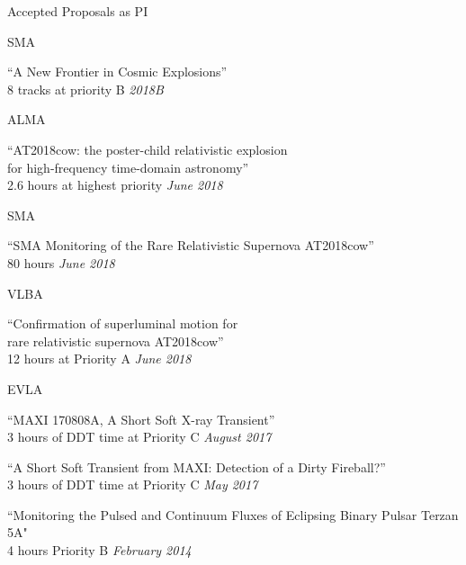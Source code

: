 \documentclass{resume} %
\begin{document}
\begin{rSection}{Accepted Proposals as PI}

\begin{rSubsection}{SMA}{}{}{}
\item ``A New Frontier in Cosmic Explosions''\\
  8 tracks at priority B \hfill {\em 2018B}
\end{rSubsection}

\begin{rSubsection}{ALMA}{}{}{}
\item ``AT2018cow: the poster-child relativistic explosion \\
  for high-frequency time-domain astronomy'' \\
  2.6 hours at highest priority \hfill {\em June 2018}
\end{rSubsection}

\begin{rSubsection}{SMA}{}{}{}
\item ``SMA Monitoring of the Rare Relativistic Supernova AT2018cow'' \\
  80 hours \hfill {\em June 2018}
\end{rSubsection}

\begin{rSubsection}{VLBA}{}{}{}
\item ``Confirmation of superluminal motion for \\
  rare relativistic supernova AT2018cow''\\
  12 hours at Priority A \hfill {\em June 2018}
\end{rSubsection}

\begin{rSubsection}{EVLA}{}{}{}
\item ``MAXI 170808A, A Short Soft X-ray Transient'' \\
  3 hours of DDT time at Priority C \hfill {\em August 2017}
\item ``A Short Soft Transient from MAXI: Detection of a Dirty Fireball?'' \\
  3 hours of DDT time at Priority C \hfill {\em May 2017}
\item ``Monitoring the Pulsed and Continuum Fluxes of Eclipsing Binary Pulsar Terzan 5A" \\
4 hours Priority B \hfill {\em February 2014}
\end{rSubsection}

\end{rSection}
\end{document}
